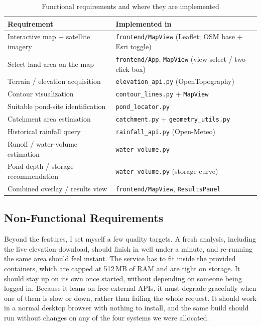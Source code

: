\documentclass[manuscript,screen]{acmart}
\begin{document}
\begin{table}[h]
  \caption{Functional requirements and where they are implemented}
  \label{tab:requirements}
  \begin{tabular}{p{3.9cm}p{3.6cm}}
    \toprule
    Requirement & Implemented in \\
    \midrule
    Interactive map + satellite imagery & \texttt{frontend/MapView} (Leaflet; OSM base + Esri toggle) \\
    Select land area on the map & \texttt{frontend/App}, \texttt{MapView} (view-select / two-click box) \\
    Terrain / elevation acquisition & \texttt{elevation\_api.py} (OpenTopography) \\
    Contour visualization & \texttt{contour\_lines.py} + \texttt{MapView} \\
    Suitable pond-site identification & \texttt{pond\_locator.py} \\
    Catchment area estimation & \texttt{catchment.py} + \texttt{geometry\_utils.py} \\
    Historical rainfall query & \texttt{rainfall\_api.py} (Open-Meteo) \\
    Runoff / water-volume estimation & \texttt{water\_volume.py} \\
    Pond depth / storage recommendation & \texttt{water\_volume.py} (storage curve) \\
    Combined overlay / results view & \texttt{frontend/MapView}, \texttt{ResultsPanel} \\
    \bottomrule
  \end{tabular}
\end{table}

\subsection{Non-Functional Requirements}
Beyond the features, I set myself a few quality targets. A fresh analysis,
including the live elevation download, should finish in well under a minute, and
re-running the same area should feel instant. The service has to fit inside the
provided containers, which are capped at 512\,MB of RAM and are tight on storage.
It should stay up on its own once started, without depending on someone being
logged in. Because it leans on free external APIs, it must degrade gracefully when
one of them is slow or down, rather than failing the whole request. It should work
in a normal desktop browser with nothing to install, and the same build should run
without changes on any of the four systems we were allocated.
\end{document}
